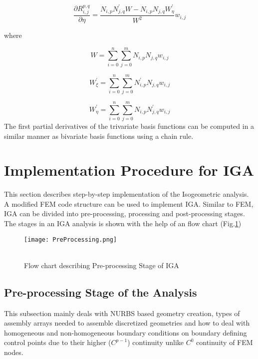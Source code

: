\documentclass[11pt]{article}
\begin{document}
\begin{equation}
\frac{\partial R_{i,j}^{p,q}}{\partial \eta} = \frac{N_{i,p} N^{'}_{j,q} W -
	N_{i,p} N_{j,q} W^{'}_{\eta}}{W^2}w_{i,j}
\end{equation}

\noindent
where

\begin{equation}
W = \sum_{i=0}^{n}\sum_{j=0}^{m}N_{i,p} N_{j,q}w_{i,j}
\end{equation}

\begin{equation}
W^{'}_{\xi} = \sum_{i=0}^{n}\sum_{j=0}^{m}N^{'}_{i,p} N_{j,q}w_{i,j}
\end{equation}

\begin{equation}
W^{'}_{\eta} = \sum_{i=0}^{n}\sum_{j=0}^{m}N_{i,p} N^{'}_{j,q}w_{i,j}
\end{equation}
The first partial derivatives of the trivariate basis functions can be computed
in a similar manner as bivariate basis functions using a chain rule.



\section{Implementation Procedure for IGA}
This section describes step-by-step implementation of the Isogeometric analysis.
A modified FEM code structure can be used to implement IGA. Similar to FEM, IGA
can be divided into pre-processing, processing and post-processing stages. The
stages in an IGA analysis is shown with the help of an flow chart
(Fig.\ref{PreProcessing})

\begin{figure}[H]
	\begin{center}
		\texttt{[image: PreProcessing.png]} 
		\caption{\\Flow chart describing Pre-processing Stage of IGA}\label{PreProcessing}
	\end{center}
	
\end{figure}
\subsection{Pre-processing Stage of the Analysis}
This subsection mainly deals with NURBS based geometry creation, types of
assembly arrays needed to assemble discretized geometries and how to deal with
homogeneous and non-homogeneous boundary conditions on boundary defining control
points due to their higher ($C^{p-1}$) continuity unlike $C^{0}$ continuity of
FEM nodes. 
\end{document}
